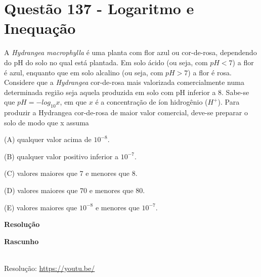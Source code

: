 \section{Questão 137 - Logaritmo e Inequação}

A \textit{Hydrangea macrophylla} é uma planta com flor azul ou cor-de-rosa, dependendo do pH do solo no qual está plantada. Em solo ácido (ou seja, com $ pH < 7 $) a flor é azul, enquanto que em solo alcalino (ou seja, com $ pH > 7 $) a flor é rosa. Considere que a \textit{Hydrangea} cor-de-rosa mais valorizada comercialmente numa determinada região seja aquela produzida em solo com pH inferior a 8. 
Sabe-se que $ pH = - log_{10} x $, em que $ x $ é a concentração de íon hidrogênio ($ H^+ $).
Para produzir a Hydrangea cor-de-rosa de maior valor comercial, deve-se preparar o solo de modo que x assuma

(A) qualquer valor acima de $ 10^{-8} $.

(B) qualquer valor positivo inferior a $ 10^{-7} $.

(C) valores maiores que 7 e menores que 8.

(D) valores maiores que 70 e menores que 80.

(E) valores maiores que $ 10^{-8} $ e menores que $ 10^{-7} $.


\textbf{Resolução}



\textbf{Rascunho}

\quad


\begin{center}
    \href{https://youtu.be/}{
    }\\
    Resolução: \url{https://youtu.be/}
\end{center}
